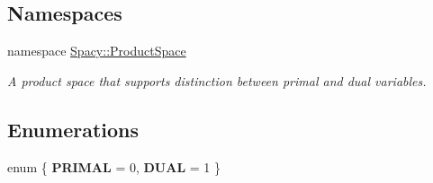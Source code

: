 \subsection*{\-Namespaces}
\begin{DoxyCompactItemize}
\item 
namespace \hyperlink{namespaceSpacy_1_1ProductSpace}{\-Spacy\-::\-Product\-Space}
\begin{DoxyCompactList}\small\item\em \-A product space that supports distinction between primal and dual variables. \end{DoxyCompactList}\end{DoxyCompactItemize}
\subsection*{\-Enumerations}
\begin{DoxyCompactItemize}
\item 
enum \{ {\bfseries \-P\-R\-I\-M\-A\-L} = 0, 
{\bfseries \-D\-U\-A\-L} = 1
 \}
\end{DoxyCompactItemize}
